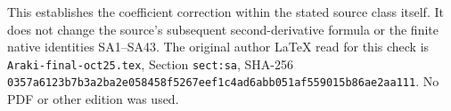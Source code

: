 \documentclass[11pt]{article}
\begin{document}
This establishes the coefficient correction within the
stated source class itself. It does not change the
source's subsequent second-derivative formula or the
finite native identities SA1--SA43.
The original author LaTeX read for this check is
\texttt{Araki-final-oct25.tex}, Section \texttt{sect:sa},
SHA-256
\texttt{0357a6123b7b3a2ba2e058458f5267eef1c4ad6abb051af559015b86ae2aa111}.
No PDF or other edition was used.
\end{document}
